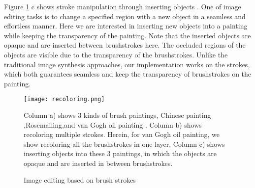 Figure \ref{recoloring} c shows stroke manipulation through inserting objects . One of image editing tasks is to change a specified region with a new object in a seamless and effortless manner. Here we are interested in inserting new objects into a painting while keeping the transparency of the painting. Note that the inserted objects are opaque and are inserted between  brushstrokes here. The occluded regions of the objects are visible due to the transparency of the brushstrokes. Unlike the traditional image synthesis approaches, our implementation works on the strokes, which both guarantees seamless and keep the transparency of brushstrokes on the painting.


\begin{figure}[H]
	\centering
	\texttt{[image: recoloring.png]}
	\caption{Image editing based on brush strokes}
	\label{recoloring}
	\medskip
Column a) shows 3 kinds of brush paintings, Chinese painting ,Rosemailing,and van Gogh oil painting . Column b) shows recoloring multiple strokes. Herein, for van Gogh oil painting, we show recoloring all the brushstrokes in one layer. Column c) shows inserting objects into these 3 paintings, in which the objects are opaque and are inserted in between brushstrokes.

\end{figure}

